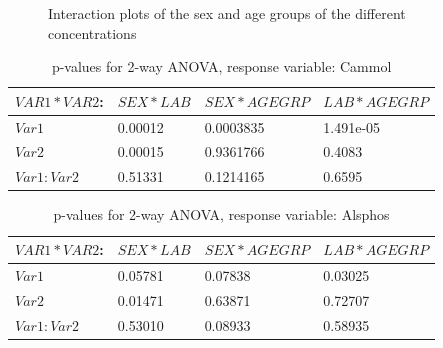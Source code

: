 \documentclass{article}
\begin{document}
\begin{figure}[H]
          \caption{Interaction plots of the sex and age groups of the different concentrations}
          \label{fig:IntAgeSex}
      \end{figure}
      

    \begin{table}[H]
    \begin{center}
    \begin{tabular}{|l|l|l|l|}
      \hline
      $VAR1 * VAR2$:&$SEX * LAB$&$SEX * AGEGRP$&$LAB*AGEGRP$\\
      \hline
      $Var1$       & 0.00012 & 0.0003835 & 1.491e-05\\
      $Var2$       & 0.00015 & 0.9361766 & 0.4083\\
      $Var1:Var2$  & 0.51331 & 0.1214165 & 0.6595\\
      \hline
    \end{tabular}
    \caption{p-values for 2-way ANOVA, response variable: Cammol}
    \label{table:AnCammol}
    \end{center}
    \end{table}

    \begin{table}[H]
    \begin{center}
    \begin{tabular}{|l|l|l|l|}
      \hline
      $VAR1 * VAR2$:&$SEX * LAB$&$SEX * AGEGRP$&$LAB*AGEGRP$\\
      \hline
      $Var1$       & 0.05781 & 0.07838 & 0.03025\\
      $Var2$       & 0.01471 & 0.63871 & 0.72707\\
      $Var1:Var2$  & 0.53010 & 0.08933 & 0.58935\\
      \hline
    \end{tabular}
    \caption{p-values for 2-way ANOVA, response variable: Alsphos}
    \label{table:AnAlsphos}
    \end{center}
    \end{table}
\end{document}
